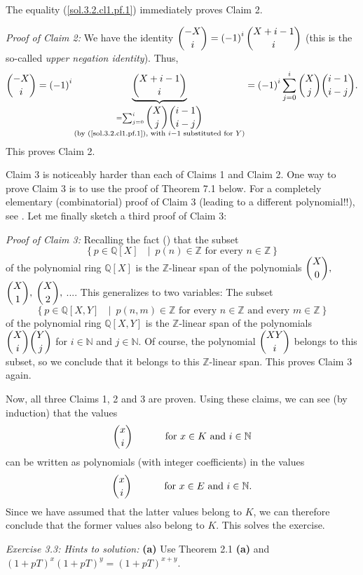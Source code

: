\documentclass[numbers=enddot,12pt,final,onecolumn,notitlepage]{scrartcl}%
\begin{document}
The equality (\ref{sol.3.2.cl1.pf.1}) immediately proves Claim 2.

\textit{Proof of Claim 2:} We have the identity $\dbinom{-X}{i}=\left(
-1\right)  ^{i}\dbinom{X+i-1}{i}$ (this is the so-called \textit{upper
negation identity}). Thus,%
\[
\dbinom{-X}{i}=\left(  -1\right)  ^{i}\underbrace{\dbinom{X+i-1}{i}%
}_{\substack{=\sum_{j=0}^{i}\dbinom{X}{j}\dbinom{i-1}{i-j}\\\text{(by
(\ref{sol.3.2.cl1.pf.1}), with }i-1\text{ substituted for }Y\text{)}}}=\left(
-1\right)  ^{i}\sum_{j=0}^{i}\dbinom{X}{j}\dbinom{i-1}{i-j}.
\]
This proves Claim 2.

Claim 3 is noticeably harder than each of Claims 1 and Claim 2. One way to
prove Claim 3 is to use the proof of Theorem 7.1 below. For a completely
elementary (combinatorial) proof of Claim 3 (leading to a different
polynomial!!), see \cite[Exercise 2]{Grin-detn}. Let me finally sketch a third
proof of Claim 3:

\textit{Proof of Claim 3:} Recalling the fact (\cite[Proposition
I.7.3]{Harts77}) that the subset%
\[
\left\{  p\in\mathbb{Q}\left[  X\right]  \text{ }\mid\ p\left(  n\right)
\in\mathbb{Z}\text{ for every }n\in\mathbb{Z}\right\}
\]
of the polynomial ring $\mathbb{Q}\left[  X\right]  $ is the $\mathbb{Z}%
$-linear span of the polynomials $\dbinom{X}{0},$ $\dbinom{X}{1},$ $\dbinom
{X}{2},$ $...$. This generalizes to two variables: The subset
\[
\left\{  p\in\mathbb{Q}\left[  X,Y\right]  \text{ }\mid\ p\left(  n,m\right)
\in\mathbb{Z}\text{ for every }n\in\mathbb{Z}\text{ and every }m\in
\mathbb{Z}\right\}
\]
of the polynomial ring $\mathbb{Q}\left[  X,Y\right]  $ is the $\mathbb{Z}%
$-linear span of the polynomials $\dbinom{X}{i}\dbinom{Y}{j}$ for
$i\in\mathbb{N}$ and $j\in\mathbb{N}$. Of course, the polynomial $\dbinom
{XY}{i}$ belongs to this subset, so we conclude that it belongs to this
$\mathbb{Z}$-linear span. This proves Claim 3 again.

Now, all three Claims 1, 2 and 3 are proven. Using these claims, we can see
(by induction) that the values%
\[
\dbinom{x}{i}\ \ \ \ \ \ \ \ \ \ \text{for }x\in K\text{ and }i\in\mathbb{N}%
\]
can be written as polynomials (with integer coefficients) in the values%
\[
\dbinom{x}{i}\ \ \ \ \ \ \ \ \ \ \text{for }x\in E\text{ and }i\in\mathbb{N}.
\]
Since we have assumed that the latter values belong to $K$, we can therefore
conclude that the former values also belong to $K$. This solves the exercise.

\textit{Exercise 3.3: Hints to solution:} \textbf{(a)} Use Theorem 2.1
\textbf{(a)} and $\left(  1+pT\right)  ^{x}\left(  1+pT\right)  ^{y}=\left(
1+pT\right)  ^{x+y}$.
\end{document}

